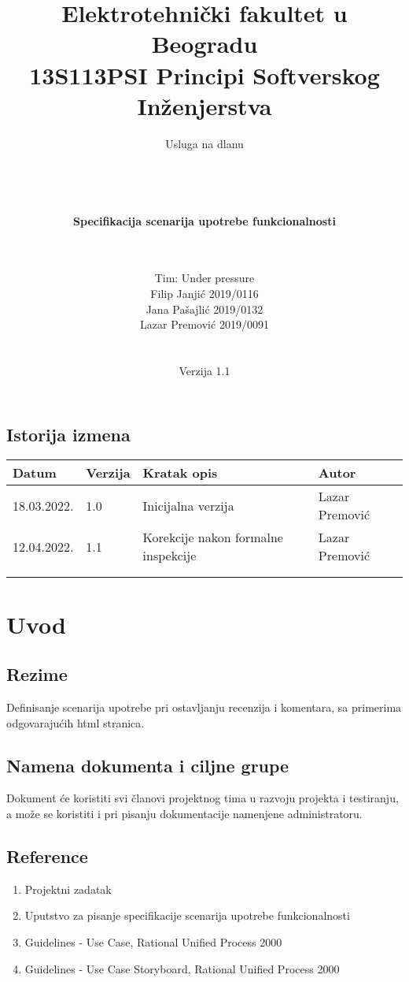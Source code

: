 \documentclass[a4paper,12pt]{report}
\title{\Large Elektrotehnički fakultet u Beogradu \\ 13S113PSI Principi Softverskog Inženjerstva}
\author{\Huge Usluga na dlanu\\ \ \\ \ \\ \ \\ \ \\
	\Large \textbf{Specifikacija scenarija upotrebe funkcionalnosti}\\\Large \textbf{\genitivfunkcionalnosti} \\ \ \\}
\date{\Large   Tim: Under pressure \\ Filip Janjić 2019/0116 \\ Jana Pašajlić 2019/0132 \\ Lazar Premović 2019/0091  \\ \  \\ \  \\
	\large Verzija 1.1}
\newcommand{\dativfunkcionalnosti }{ostavljanju recenzija i komentara}
\newcommand{\inicijalniautor}{Lazar Premović}
\newcommand{\inicijalnidatum}{18.03.2022.}
\begin{document}
	
	\maketitle
	
	\begin{center}
		\section*{Istorija izmena}
			\begin{tabular}{ |l|l|l|l| }
				\hline
				\textbf{Datum} & \textbf{Verzija} & \textbf{Kratak opis} & \textbf{Autor} \\ 
				\hline
				\inicijalnidatum & 1.0  & Inicijalna verzija & \inicijalniautor \\
				\hline
				12.04.2022. & 1.1 & Korekcije nakon formalne inspekcije & \inicijalniautor \\
				\hline
				&  &  &  \\
				\hline
				&  &  &  \\
				\hline
			\end{tabular}
	\end{center}
	
	\newpage
	
	\tableofcontents
	
	\newpage
	
	\section{Uvod}
		\subsection{Rezime}
			Definisanje scenarija upotrebe pri \dativfunkcionalnosti, sa primerima odgovarajućih html stranica.
		\subsection{Namena dokumenta i ciljne grupe}
			Dokument će koristiti svi članovi projektnog tima u razvoju projekta i testiranju, a može se koristiti i pri pisanju dokumentacije namenjene administratoru.
		\subsection{Reference}
			\begin{enumerate}
				\item Projektni zadatak
				\item Uputstvo za pisanje specifikacije scenarija upotrebe funkcionalnosti
				\item Guidelines - Use Case, Rational Unified Process 2000
				\item Guidelines - Use Case Storyboard, Rational Unified Process 2000
			\end{enumerate}
\end{document}
